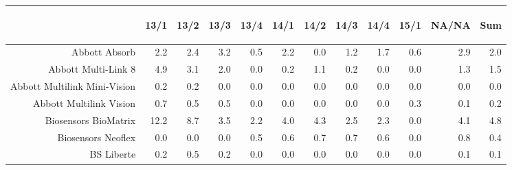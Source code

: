 \documentclass[presentation,xcolor=pdftex,dvipsnames,table]{beamer}
\begin{document}
\begin{frame}
\begin{tiny}
\begin{table}[ht]
\centering
\begin{tabular}{rrrrrrrrrrrr}
  \toprule
 & \begin{sideways} 13/1 \end{sideways} & \begin{sideways} 13/2 \end{sideways} & \begin{sideways} 13/3 \end{sideways} & \begin{sideways} 13/4 \end{sideways} & \begin{sideways} 14/1 \end{sideways} & \begin{sideways} 14/2 \end{sideways} & \begin{sideways} 14/3 \end{sideways} & \begin{sideways} 14/4 \end{sideways} & \begin{sideways} 15/1 \end{sideways} & \begin{sideways} NA/NA \end{sideways} & \begin{sideways} Sum \end{sideways} \\ 
  \midrule
Abbott Absorb & 2.2 & 2.4 & 3.2 & 0.5 & 2.2 & 0.0 & 1.2 & 1.7 & 0.6 & 2.9 & 2.0 \\ 
  Abbott Multi-Link 8 & 4.9 & 3.1 & 2.0 & 0.0 & 0.2 & 1.1 & 0.2 & 0.0 & 0.0 & 1.3 & 1.5 \\ 
  Abbott Multilink Mini-Vision & 0.2 & 0.2 & 0.0 & 0.0 & 0.0 & 0.0 & 0.0 & 0.0 & 0.0 & 0.0 & 0.0 \\ 
  Abbott Multilink Vision & 0.7 & 0.5 & 0.5 & 0.0 & 0.0 & 0.0 & 0.0 & 0.0 & 0.3 & 0.1 & 0.2 \\ 
  Biosensors BioMatrix & 12.2 & 8.7 & 3.5 & 2.2 & 4.0 & 4.3 & 2.5 & 2.3 & 0.0 & 4.1 & 4.8 \\ 
  Biosensors Neoflex & 0.0 & 0.0 & 0.0 & 0.5 & 0.6 & 0.7 & 0.7 & 0.6 & 0.0 & 0.8 & 0.4 \\ 
  BS Liberte & 0.2 & 0.5 & 0.2 & 0.0 & 0.0 & 0.0 & 0.0 & 0.0 & 0.0 & 0.1 & 0.1 \\ 

\end{tabular}
\end{table}
\end{tiny}
\end{frame}
\end{document}
